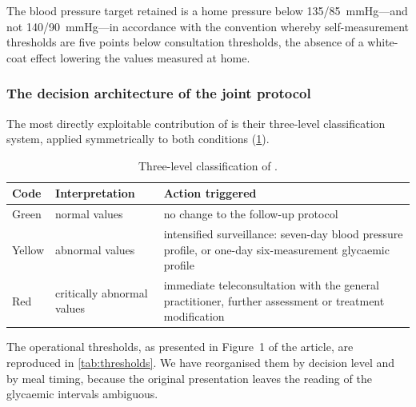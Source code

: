 \documentclass[12pt,a4paper,oneside]{report}
\begin{document}
The blood pressure target retained is a home pressure below 135/85~mmHg---and not 140/90~mmHg---in accordance with the convention whereby self-measurement thresholds are five points below consultation thresholds, the absence of a white-coat effect lowering the values measured at home.

\subsubsection{The decision architecture of the joint protocol}\label{sec:triage}

The most directly exploitable contribution of \textcite{mihevc2025} is their three-level classification system, applied symmetrically to both conditions (\cref{tab:triage-levels}).

\begin{table}[htbp]
\centering\small
\caption{Three-level classification of \textcite{mihevc2025}.}\label{tab:triage-levels}
\begin{tabularx}{\textwidth}{@{}>{\raggedright\arraybackslash}p{1.7cm} >{\raggedright\arraybackslash}p{3.6cm} X@{}}
\toprule
\textbf{Code} & \textbf{Interpretation} & \textbf{Action triggered} \\
\midrule
Green & normal values & no change to the follow-up protocol \\
Yellow & abnormal values & intensified surveillance: seven-day blood pressure profile, or one-day six-measurement glycaemic profile \\
Red & critically abnormal values & immediate teleconsultation with the general practitioner, further assessment or treatment modification \\
\bottomrule
\end{tabularx}
\end{table}

The operational thresholds, as presented in Figure~1 of the article, are reproduced in \cref{tab:thresholds}. We have reorganised them by decision level and by meal timing, because the original presentation leaves the reading of the glycaemic intervals ambiguous.
\end{document}

